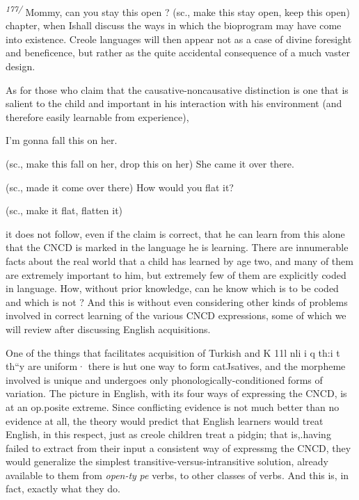 \textit{\textsuperscript{1}}\textit{\textsuperscript{7}}\textit{\textsuperscript{7}}\textit{\textsuperscript{/ }}Mommy, can you stay this open ?
(sc., make this stay open, keep this open)
chapter, when Ishall discuss the ways in which the bioprogram may
have come into existence. Creole languages will then appear not as a case of divine foresight and beneficence, but rather as the quite acci\-dental consequence of a much vaster design.

As for those who claim that the causative-noncausative distinc\-tion is one that is salient to the child and important in his interaction with his environment (and therefore easily learnable from experience),

\ea\label{ex:78}
\z

\ea\label{ex:79}
\z

\ea\label{ex:80}
\z

I'm gonna fall this on her.

(sc., make this fall on her, drop this on her) She came it over there.

(sc., made it come over there) How would you flat it?

(sc., make it flat, flatten it)

it does not follow, even if the claim is correct, that he can learn from this alone that the CNCD is marked in the language he is learning. There are innumerable facts about the real world that a child has learned by age two, and many of them are extremely important to him, but extremely few of them are explicitly coded in language. How, without prior knowledge, can he know which is to be coded and which is not ? And this is without even considering other kinds of problems involved in correct learning of the various CNCD expressions, some of which we will review after discussing English acquisitions.

One of the things that facilitates acquisition of Turkish and K 11l nli i q th:i t th``y are uniform· there is hut one way to form catJsatives, and the morpheme involved is unique and undergoes only phonologically-conditioned forms of variation. The picture in English, with its four ways of expressing the CNCD, is at an op.posite extreme. Since conflicting evidence is not much better than no evidence at all, the theory would predict that English learners would treat En\-glish, in this respect, just as creole children treat a pidgin; that is,.having failed to extract from their input a consistent way of expressmg the CNCD, they would generalize the simplest transitive-versus-intransitive solution, already available to them from \textit{open-}\textit{t}\textit{y} \textit{pe }verbs, to other classes of verbs. And this is, in fact, exactly what they do.


